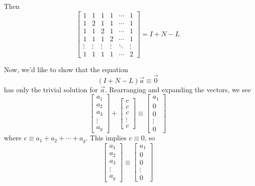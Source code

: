 \documentclass[a4paper, reqno, 12pt]{amsart}
\begin{document}
		Then
		\[
			\begin{bmatrix}
				1      & 1      & 1      & 1      & \cdots & 1      \\
				1      & 2      & 1      & 1      & \cdots & 1      \\
				1      & 1      & 2      & 1      & \cdots & 1      \\
				1      & 1      & 1      & 2      & \cdots & 1      \\
				\vdots & \vdots & \vdots & \vdots & \ddots & \vdots \\
				1      & 1      & 1      & 1      & \cdots & 2
			\end{bmatrix}
			= I + N - L
		\]
		
		Now, we'd like to show that the equation
		\[
			(I + N - L)\vec{a} \equiv \vec{0}
		\]
		has only the trivial solution for $\vec{a}$. Rearranging and expanding the vectors, we see
		\[
			\begin{bmatrix}
				a_1    \\
				a_2    \\
				a_3    \\
				\vdots \\
				a_g
			\end{bmatrix}
			+
			\begin{bmatrix}
				c      \\
				c      \\
				c      \\
				\vdots \\
				c
			\end{bmatrix}
			\equiv
			\begin{bmatrix}
				a_1    \\
				0      \\
				0      \\
				\vdots \\
				0
			\end{bmatrix}
		\]
		where $c \equiv a_1 + a_2 + \cdots + a_g$. This implies $c \equiv 0$, so
		\[
			\begin{bmatrix}
				a_1    \\
				a_2    \\
				a_3    \\
				\vdots \\
				a_g
			\end{bmatrix}
			\equiv
			\begin{bmatrix}
				a_1    \\
				0      \\
				0      \\
				\vdots \\
				0
			\end{bmatrix}
		\]
\end{document}
